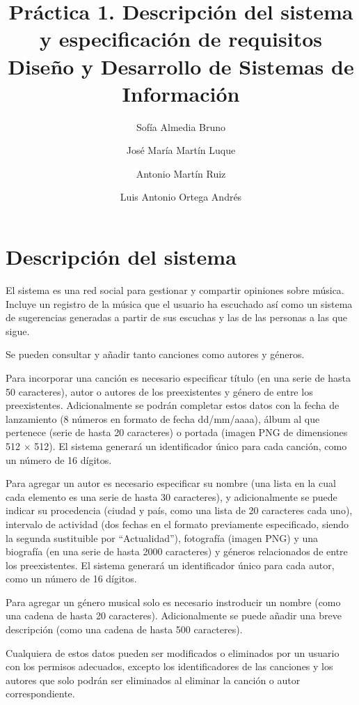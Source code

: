 \documentclass[
  12pt,
  a4paper,
  DIV=12,
  spanish,
]{scrartcl}
\title{Práctica 1. Descripción del sistema y especificación de requisitos \\\large Diseño y Desarrollo de Sistemas de Información}
\author{Sofía Almedia Bruno \and José María Martín Luque \and Antonio Martín Ruiz \and Luis Antonio Ortega Andrés}
\begin{document}
\maketitle

\section{Descripción del sistema} %

El sistema es una red social para gestionar y compartir opiniones sobre música. Incluye un registro de la música que el usuario ha escuchado así como un sistema de sugerencias generadas a partir de sus escuchas y las de las personas a las que sigue.

Se pueden consultar y añadir tanto canciones como autores y géneros.

Para incorporar una canción es necesario especificar título (en una serie de hasta 50 caracteres), autor o autores de los preexistentes y género de entre los preexistentes. Adicionalmente se podrán completar estos datos con la fecha de lanzamiento (8 números en formato de fecha dd/mm/aaaa), álbum al que pertenece (serie de hasta 20 caracteres) o portada (imagen PNG de dimensiones 512 $\times$ 512). El sistema generará un identificador único para cada canción, como un número de 16 dígitos.

Para agregar un autor es necesario especificar su nombre (una lista en la cual cada elemento es una serie de hasta 30 caracteres), y adicionalmente se puede indicar su procedencia (ciudad y país, como una lista de 20 caracteres cada uno), intervalo de actividad (dos fechas en el formato previamente especificado, siendo la segunda sustituible por ``Actualidad''), fotografía (imagen PNG) y una biografía (en una serie de hasta 2000 caracteres) y géneros relacionados de entre los preexistentes. El sistema generará un identificador único para cada autor, como un número de 16 dígitos.

Para agregar un género musical solo es necesario instroducir un nombre (como una cadena de hasta 20 caracteres). Adicionalmente se puede añadir una breve descripción (como una cadena de hasta 500 caracteres).

Cualquiera de estos datos pueden ser modificados o eliminados por un usuario con los permisos adecuados, excepto los identificadores de las canciones y los autores que solo podrán ser eliminados al eliminar la canción o autor correspondiente.

\end{document}
